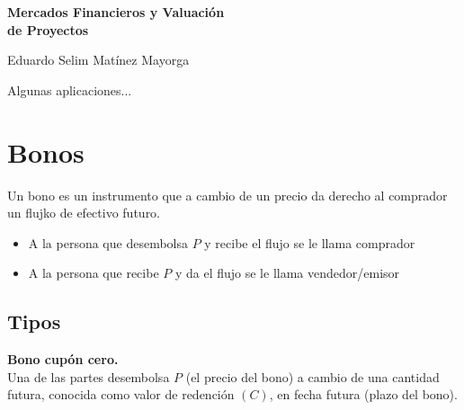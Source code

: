 





\begin{titlingpage} %

    \raggedleft %
	
	\vspace*{\baselineskip} %
	
	\vspace*{0.25\textheight} %
	
    
    \vspace*{0.1\textheight}

    {\Huge{\textbf{Mercados Financieros y Valuación\\ de Proyectos}}}\\[\baselineskip] %
    \vspace*{0.1\textheight}

    
    {\Large Eduardo Selim Matínez Mayorga}\\[\baselineskip]
	
	\vfill

\end{titlingpage}

\thispagestyle{empty}

Algunas aplicaciones...
\section*{Bonos}
Un bono es un instrumento que a cambio de un precio da derecho al comprador un flujko de efectivo futuro.
\begin{itemize}
    \item A la persona que desembolsa $P$ y recibe el flujo se le llama comprador 
    \item A la persona que recibe $P$ y da el flujo se le llama vendedor/emisor
\end{itemize}
\subsection*{Tipos}
\textbf{Bono cupón cero.}\\
Una de las partes desembolsa $P$ (el precio del bono) a cambio de una cantidad futura, conocida como valor de redención $(C)$, en fecha futura (plazo del bono).

